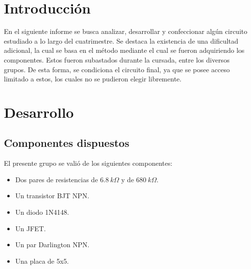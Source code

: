 







\tableofcontents
\newpage

\section{Introducción}
En el siguiente informe se busca analizar, desarrollar y confeccionar algún circuito estudiado a lo largo del cuatrimestre. Se destaca la existencia de una dificultad adicional, la cual se basa en el método mediante el cual se fueron adquiriendo los componentes. Estos fueron subastados durante la cursada, entre los diversos grupos. De esta forma, se condiciona el circuito final, ya que se posee acceso limitado a estos, los cuales no se pudieron elegir libremente.

\section{Desarrollo}

\subsection{Componentes dispuestos}
El presente grupo se valió de los siguientes componentes:
\begin{itemize}
	\item Dos pares de resistencias de $6.8 \ k\Omega$ y de $680 \ k\Omega$.
	\item Un transistor BJT NPN. 
	\item Un diodo 1N4148.
	\item Un JFET.
	\item Un par Darlington NPN.
	\item Una placa de 5x5.
\end{itemize}

